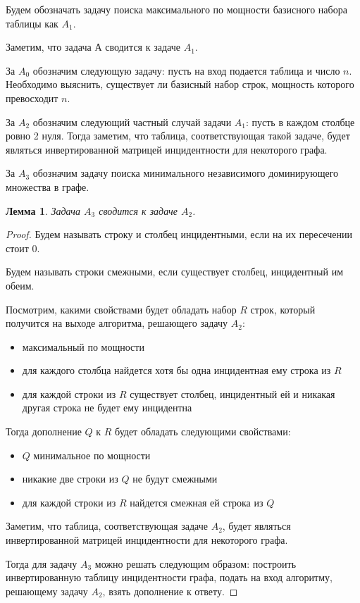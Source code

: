 \documentclass[a4paper,14pt]{extreport}
\newtheorem{lm}{Лемма}
\begin{document}
Будем обозначать задачу поиска максимального по мощности базисного набора таблицы как $A_1$.

Заметим, что задача А сводится к задаче $A_1$.

За $A_0$ обозначим следующую задачу: пусть на вход подается таблица и число $n$. Необходимо выяснить, существует ли базисный набор строк, мощность которого превосходит $n$.

За $A_2$ обозначим следующий частный случай задачи $A_1$: пусть в каждом столбце ровно 2 нуля. Тогда заметим, что таблица, соответствующая такой задаче, будет являться инвертированной матрицей инцидентности для некоторого графа.

За $A_3$ обозначим задачу поиска минимального независимого доминирующего множества в графе.

\begin{lm}
Задача $A_3$ сводится к задаче $A_2$.
\end{lm}
\begin{proof}
Будем называть строку и столбец инцидентными, если на их пересечении стоит 0. 

Будем называть строки смежными, если существует столбец, инцидентный им обеим.

Посмотрим, какими свойствами будет обладать набор $R$ строк, который получится на выходе алгоритма, решающего задачу $A_2$:
\begin{itemize}
\item максимальный по мощности    
\item для каждого столбца найдется хотя бы одна инцидентная ему строка из $R$
\item для каждой строки из $R$ существует столбец, инцидентный ей и никакая другая строка не будет ему инцидентна     
\end{itemize}

Тогда дополнение $Q$ к $R$ будет обладать следующими свойствами:
\begin{itemize}
\item $Q$ минимальное по мощности    
\item никакие две строки из $Q$ не будут смежными
\item для каждой строки из $R$ найдется смежная ей строка из $Q$     
\end{itemize}

Заметим, что таблица, соответствующая задаче $A_2$, будет являться инвертированной матрицей инцидентности для некоторого графа.

Тогда для задачу $A_3$ можно решать следующим образом: построить инвертированную таблицу инцидентности графа, подать на вход алгоритму, решающему задачу $A_2$, взять дополнение к ответу.
\end{proof}
\end{document}
